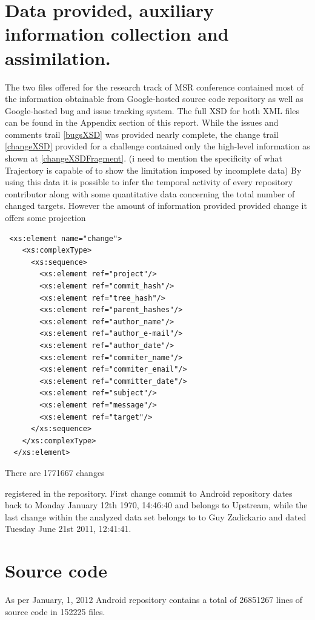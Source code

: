 \documentclass[a4paper,10pt]{report}
\numberwithin{equation}{subsection}
\begin{document}
\section{Data provided, auxiliary information collection and assimilation.}
The two files offered for the research track of MSR conference contained most of the information
obtainable from Google-hosted source code repository as well as Google-hosted bug and issue
tracking system. The full XSD for both XML files can be found in the Appendix section of this report.
While the issues and comments trail \ref{bugsXSD} was provided nearly complete,
the change trail \ref{changeXSD} provided for a challenge contained only the high-level information as 
shown at \ref{changeXSDFragment}. (i need to mention the specificity of what Trajectory is capable of
to show the limitation imposed by incomplete data)
By using this data it is possible to infer the temporal activity of every repository contributor along with some quantitative data concerning the total number of changed 
targets. However the amount of information provided provided change it offers some projection 
\lstset{label=changeXSDFragment,caption=List of metadata provided by change trail XML (fragment) }
\begin{lstlisting}
 <xs:element name="change">
    <xs:complexType>
      <xs:sequence>
        <xs:element ref="project"/>
        <xs:element ref="commit_hash"/>
        <xs:element ref="tree_hash"/>
        <xs:element ref="parent_hashes"/>
        <xs:element ref="author_name"/>
        <xs:element ref="author_e-mail"/>
        <xs:element ref="author_date"/>
        <xs:element ref="commiter_name"/>
        <xs:element ref="commiter_email"/>
        <xs:element ref="committer_date"/>
        <xs:element ref="subject"/>
        <xs:element ref="message"/>
        <xs:element ref="target"/>
      </xs:sequence>
    </xs:complexType>
  </xs:element>
\end{lstlisting}



There are 1771667 changes 

registered in the repository. First change commit to Android repository dates back 
to Monday January 12th 1970, 14:46:40 and belongs to Upstream, while the last change
within the analyzed data set belongs to to Guy Zadickario and dated 
Tuesday June 21st 2011, 12:41:41.


\section{Source code}
As per January, 1, 2012 Android repository contains a total of 26851267 lines of source code in 
152225 files. 
\end{document}
